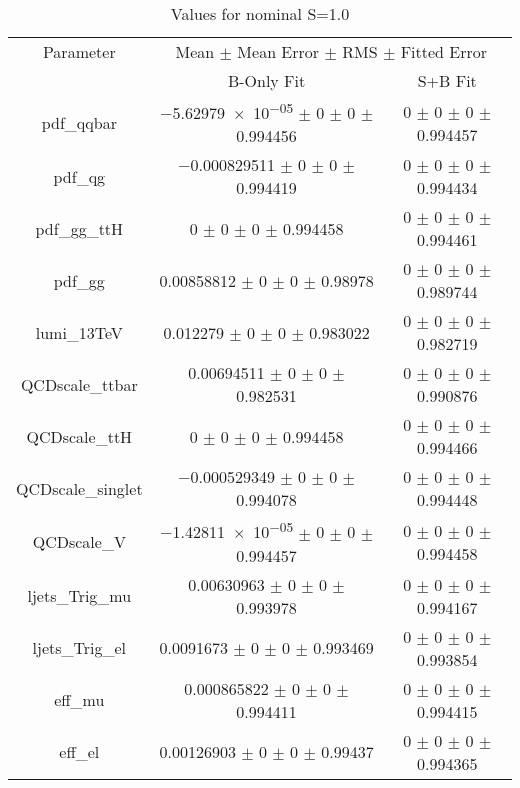 \begin{table}
\centering
\caption{Values for nominal S=1.0}
\begin{tabular}{ccc}
\toprule
Parameter 	& \multicolumn{2}{c}{Mean $\pm$ Mean Error $\pm$ RMS $\pm$ Fitted Error}\\
 	& B-Only Fit & S+B Fit\\
\midrule
pdf\_qqbar 	& \num{-5.62979e-05} $\pm$ \num{0} $\pm$ \num{0} $\pm$ \num{0.994456} 	& \num{0} $\pm$ \num{0} $\pm$ \num{0} $\pm$ \num{0.994457}\\
pdf\_qg 	& \num{-0.000829511} $\pm$ \num{0} $\pm$ \num{0} $\pm$ \num{0.994419} 	& \num{0} $\pm$ \num{0} $\pm$ \num{0} $\pm$ \num{0.994434}\\
pdf\_gg\_ttH 	& \num{0} $\pm$ \num{0} $\pm$ \num{0} $\pm$ \num{0.994458} 	& \num{0} $\pm$ \num{0} $\pm$ \num{0} $\pm$ \num{0.994461}\\
pdf\_gg 	& \num{0.00858812} $\pm$ \num{0} $\pm$ \num{0} $\pm$ \num{0.98978} 	& \num{0} $\pm$ \num{0} $\pm$ \num{0} $\pm$ \num{0.989744}\\
lumi\_13TeV 	& \num{0.012279} $\pm$ \num{0} $\pm$ \num{0} $\pm$ \num{0.983022} 	& \num{0} $\pm$ \num{0} $\pm$ \num{0} $\pm$ \num{0.982719}\\
QCDscale\_ttbar 	& \num{0.00694511} $\pm$ \num{0} $\pm$ \num{0} $\pm$ \num{0.982531} 	& \num{0} $\pm$ \num{0} $\pm$ \num{0} $\pm$ \num{0.990876}\\
QCDscale\_ttH 	& \num{0} $\pm$ \num{0} $\pm$ \num{0} $\pm$ \num{0.994458} 	& \num{0} $\pm$ \num{0} $\pm$ \num{0} $\pm$ \num{0.994466}\\
QCDscale\_singlet 	& \num{-0.000529349} $\pm$ \num{0} $\pm$ \num{0} $\pm$ \num{0.994078} 	& \num{0} $\pm$ \num{0} $\pm$ \num{0} $\pm$ \num{0.994448}\\
QCDscale\_V 	& \num{-1.42811e-05} $\pm$ \num{0} $\pm$ \num{0} $\pm$ \num{0.994457} 	& \num{0} $\pm$ \num{0} $\pm$ \num{0} $\pm$ \num{0.994458}\\
ljets\_Trig\_mu 	& \num{0.00630963} $\pm$ \num{0} $\pm$ \num{0} $\pm$ \num{0.993978} 	& \num{0} $\pm$ \num{0} $\pm$ \num{0} $\pm$ \num{0.994167}\\
ljets\_Trig\_el 	& \num{0.0091673} $\pm$ \num{0} $\pm$ \num{0} $\pm$ \num{0.993469} 	& \num{0} $\pm$ \num{0} $\pm$ \num{0} $\pm$ \num{0.993854}\\
eff\_mu 	& \num{0.000865822} $\pm$ \num{0} $\pm$ \num{0} $\pm$ \num{0.994411} 	& \num{0} $\pm$ \num{0} $\pm$ \num{0} $\pm$ \num{0.994415}\\
eff\_el 	& \num{0.00126903} $\pm$ \num{0} $\pm$ \num{0} $\pm$ \num{0.99437} 	& \num{0} $\pm$ \num{0} $\pm$ \num{0} $\pm$ \num{0.994365}\\

\end{tabular}
\end{table}
